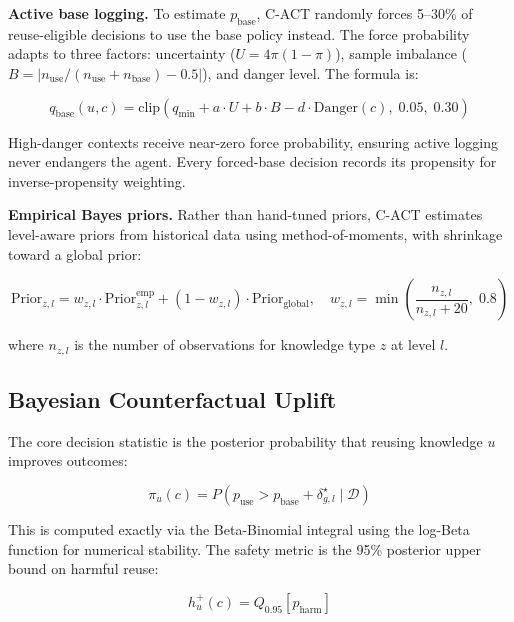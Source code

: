 \documentclass[letterpaper]{article}
\begin{document}
\textbf{Active base logging.} To estimate $p_{\text{base}}$, \textsc{C-ACT} randomly forces 5--30\% of reuse-eligible decisions to use the base policy instead. The force probability adapts to three factors: uncertainty ($U = 4\pi(1-\pi)$), sample imbalance ($B = |n_{\text{use}} / (n_{\text{use}} + n_{\text{base}}) - 0.5|$), and danger level. The formula is:

\begin{equation}
q_{\text{base}}(u,c) = \text{clip}(q_{\min} + a \cdot U + b \cdot B - d \cdot \text{Danger}(c), \; 0.05, \; 0.30)
\end{equation}

High-danger contexts receive near-zero force probability, ensuring active logging never endangers the agent. Every forced-base decision records its propensity for inverse-propensity weighting.

\textbf{Empirical Bayes priors.} Rather than hand-tuned priors, \textsc{C-ACT} estimates level-aware priors from historical data using method-of-moments, with shrinkage toward a global prior:

\begin{equation}
\text{Prior}_{z,l} = w_{z,l} \cdot \text{Prior}_{z,l}^{\text{emp}} + (1 - w_{z,l}) \cdot \text{Prior}_{\text{global}}, \quad w_{z,l} = \min\left(\frac{n_{z,l}}{n_{z,l} + 20}, \; 0.8\right)
\end{equation}

where $n_{z,l}$ is the number of observations for knowledge type $z$ at level $l$.

\subsection{Bayesian Counterfactual Uplift}

The core decision statistic is the posterior probability that reusing knowledge $u$ improves outcomes:

\begin{equation}
\boxed{\pi_u(c) = P(p_{\text{use}} > p_{\text{base}} + \delta_{g,l}^\star \mid \mathcal{D})}
\end{equation}

This is computed exactly via the Beta-Binomial integral using the log-Beta function for numerical stability. The safety metric is the 95\% posterior upper bound on harmful reuse:

\begin{equation}
h_u^+(c) = Q_{0.95}[p_{\text{harm}}]
\end{equation}
\end{document}
